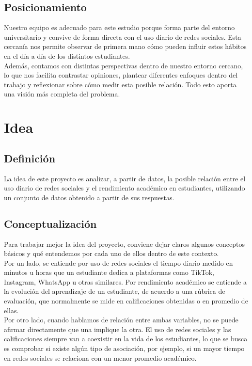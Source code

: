 \documentclass[12pt]{article}
\begin{document}
\subsection{Posicionamiento}
Nuestro equipo es adecuado para este estudio porque forma parte del entorno universitario y convive de forma directa con el uso diario de redes sociales. Esta cercanía nos permite observar de primera mano cómo pueden influir estos hábitos en el día a día de los distintos estudiantes.
\\
Además, contamos con distintas perspectivas dentro de nuestro entorno cercano, lo que nos facilita contrastar opiniones, plantear diferentes enfoques dentro del trabajo y reflexionar sobre cómo medir esta posible relación. Todo esto aporta una visión más completa del problema.

\section{Idea}
\subsection{Definición}
La idea de este proyecto es analizar, a partir de datos, la posible relación entre el uso diario de redes sociales y el rendimiento académico en estudiantes, utilizando un conjunto de datos obtenido a partir de sus respuestas.

\subsection{Conceptualización}
Para trabajar mejor la idea del proyecto, conviene dejar claros algunos conceptos básicos y qué entendemos por cada uno de ellos dentro de este contexto.
\\
Por un lado, se entiende por uso de redes sociales el tiempo diario medido en minutos u horas que un estudiante dedica a plataformas como TikTok, Instagram, WhatsApp u otras similares. 
Por rendimiento académico se entiende a la evolución del aprendizaje de un estudiante, de acuerdo a una rúbrica de evaluación, que normalmente se mide en calificaciones obtenidas o en promedio de ellas.
\\
Por otro lado, cuando hablamos de relación entre ambas variables, no se puede afirmar directamente que una implique la otra. El uso de redes sociales y las calificaciones siempre van a coexistir en la vida de los estudiantes, lo que se busca es comprobar si existe algún tipo de asociación, por ejemplo, si un mayor tiempo en redes sociales se relaciona con un menor promedio académico.
\end{document}
